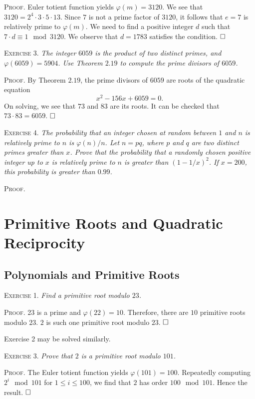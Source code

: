 \documentclass[11pt, leqno]{article}
\newcommand{\done}{\ensuremath{\hfill\square}}
\begin{document}
\textsc{Proof}. Euler totient function yields $\varphi(m) = 3120$. We see that $3120 = 2^4 \cdot 3 \cdot 5 \cdot 13$. Since $7$ is not a prime factor of $3120$, it follows that $e = 7$ is relatively prime to $\varphi(m)$. We need to find a positive integer $d$ such that $7\cdot d \equiv 1 \mod 3120$.
We observe that $d = 1783$ satisfies the condition. \done

\textsc{Exercise 3}. \emph{The integer $6059$ is the product of two distinct primes, and $\varphi(6059) = 5904$. Use Theorem $2.19$ to compute the prime divisors of $6059$.}

\textsc{Proof}. By Theorem $2.19$, the prime divisors of $6059$ are roots of the quadratic equation 
\begin{displaymath}
x^2 - 156x + 6059 = 0.
\end{displaymath}
On solving, we see that $73$ and $83$ are its roots. It can be checked that $73\cdot 83 = 6059$. \done

\textsc{Exercise 4}. \emph{The probability that an integer chosen at random between $1$ and $n$ is relatively prime to $n$ is $\varphi(n)/n$. Let $n=pq$, where $p$ and $q$ are two distinct primes greater than $x$. Prove that the probability that a randomly chosen positive integer up to $x$ is relatively prime to $n$ is greater than $(1-1/x)^{2}$. If $x=200$, this probability is greater than $0.99$.}

\textsc{Proof}. 

\clearpage
\section{Primitive Roots and Quadratic Reciprocity}

\subsection{Polynomials and Primitive Roots}

\textsc{Exercise 1}. \emph{Find a primitive root modulo $23$.}

\textsc{Proof}. 23 is a prime and $\varphi(22) = 10$. Therefore, there are $10$ primitive roots modulo $23$. $2$ is such one primitive root modulo $23$. \done

Exercise 2 may be solved similarly.

\textsc{Exercise 3}. \emph{Prove that $2$ is a primitive root modulo $101$.}

\textsc{Proof}. The Euler totient function yields $\varphi(101) = 100$. Repeatedly computing $2^i \mod 101$ for $1\leq i \leq 100$, we find that $2$ has order $100 \mod 101$. Hence the result. \done
\end{document}
